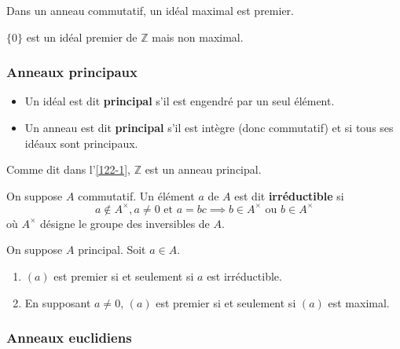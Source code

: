   \begin{corollary}
    Dans un anneau commutatif, un idéal maximal est premier.
  \end{corollary}

  \begin{cexample}
    $\{ 0 \}$ est un idéal premier de $\mathbb{Z}$ mais non maximal.
  \end{cexample}

  \subsubsection{Anneaux principaux}


  \begin{definition}
    \begin{itemize}
      \item Un idéal est dit \textbf{principal} s'il est engendré par un seul élément.
      \item Un anneau est dit \textbf{principal} s'il est intègre (donc commutatif) et si tous ses idéaux sont principaux.
    \end{itemize}
  \end{definition}

  \begin{example}
    Comme dit dans l'\cref{122-1}, $\mathbb{Z}$ est un anneau principal.
  \end{example}


  \begin{definition}
    On suppose $A$ commutatif. Un élément $a$ de $A$ est dit \textbf{irréductible} si
    \[ a \notin A^\times, a \neq 0 \text{ et } a = bc \implies b \in A^\times \text{ ou } b \in A^\times \]
    où $A^\times$ désigne le groupe des inversibles de $A$.
  \end{definition}

  \begin{theorem}
    On suppose $A$ principal. Soit $a \in A$.
    \begin{enumerate}[label=(\roman*)]
      \item $(a)$ est premier si et seulement si $a$ est irréductible.
      \item En supposant $a \neq 0$, $(a)$ est premier si et seulement si $(a)$ est maximal.
    \end{enumerate}
  \end{theorem}

  \subsubsection{Anneaux euclidiens}

